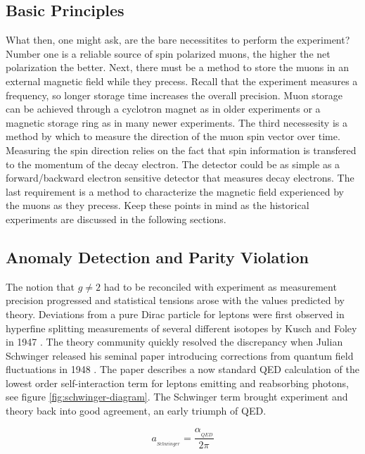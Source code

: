 \subsection{Basic Principles}
What then, one might ask, are the bare necessitites to perform the \gmtwo experiment?  Number one is a reliable source of spin polarized muons, the higher the net polarization the better.  Next, there must be a method to store the muons in an external magnetic field while they precess.  Recall that the experiment measures a frequency, so longer storage time increases the overall precision. Muon storage can be achieved through a cyclotron magnet as in older experiments or a magnetic storage ring as in many newer experiments.  The third necessesity is a method by which to measure the direction of the muon spin vector over time.  Measuring the spin direction relies on the fact that spin information is transfered to the momentum of the decay electron.  The detector could be as simple as a forward/backward electron sensitive detector that measures decay electrons.  The last requirement is a method to characterize the magnetic field experienced by the muons as they precess.  Keep these points in mind as the historical experiments are discussed in the following sections.

\subsection{Anomaly Detection and Parity Violation}

The notion that $g \ne 2$ had to be reconciled with experiment as measurement precision progressed and statistical tensions arose with the values predicted by theory.  Deviations from a pure Dirac particle for leptons were first observed in hyperfine splitting measurements of several different isotopes by Kusch and Foley in 1947 \cite{kusch-foley}.  The theory community quickly resolved the discrepancy when Julian Schwinger released his seminal paper introducing corrections from quantum field fluctuations in 1948 \cite{schwinger}.  The paper describes a now standard QED calculation of the lowest order self-interaction term for leptons emitting and reabsorbing photons, see figure \ref{fig:schwinger-diagram}.  The Schwinger term brought experiment and theory back into good agreement, an early triumph of QED.

\begin{equation}
\label{eqn:schwinger-correction}
a_{_{Schwinger}} = \frac{\alpha_{_{QED}}}{2\pi}
\end{equation}

